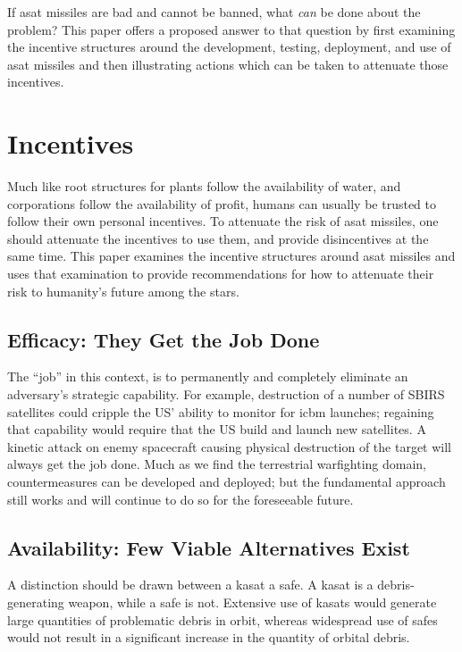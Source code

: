 If \ac{asat} missiles are bad and cannot be banned, what \emph{can} be
done about the problem?  This paper offers a proposed answer to that
question by first examining the incentive structures around the
development, testing, deployment, and use of \ac{asat} missiles and
then illustrating actions which can be taken to attenuate those
incentives.

\section*{Incentives}
Much like root structures for plants follow the availability of water,
and corporations follow the availability of profit, humans can usually
be trusted to follow their own personal incentives.  To attenuate the
risk of \ac{asat} missiles, one should attenuate the incentives to use
them, and provide disincentives at the same time.  This paper examines
the incentive structures around \ac{asat} missiles and uses that
examination to provide recommendations for how to attenuate their risk
to humanity's future among the stars.


\subsection*{Efficacy: They Get the Job Done}

The ``job'' in this context, is to permanently and completely
eliminate an adversary's strategic capability.  For example,
destruction of a number of SBIRS satellites could cripple the US'
ability to monitor for \acl{icbm} launches; regaining that capability
would require that the US build and launch new satellites.  A kinetic
attack on enemy spacecraft causing physical destruction of the target
will always get the job done.  Much as we find the terrestrial
warfighting domain, countermeasures can be developed and deployed; but
the fundamental approach still works and will continue to do so for
the foreseeable future.


\subsection*{Availability: Few Viable Alternatives Exist}

A distinction should be drawn between a \ac{kasat} a \ac{safe}.  A
\acf{kasat} is a debris-generating weapon, while a \ac{safe} is not.
Extensive use of \acp{kasat} would generate large quantities of
problematic debris in orbit, whereas widespread use of \acp{safe}
would not result in a significant increase in the quantity of orbital
debris.

